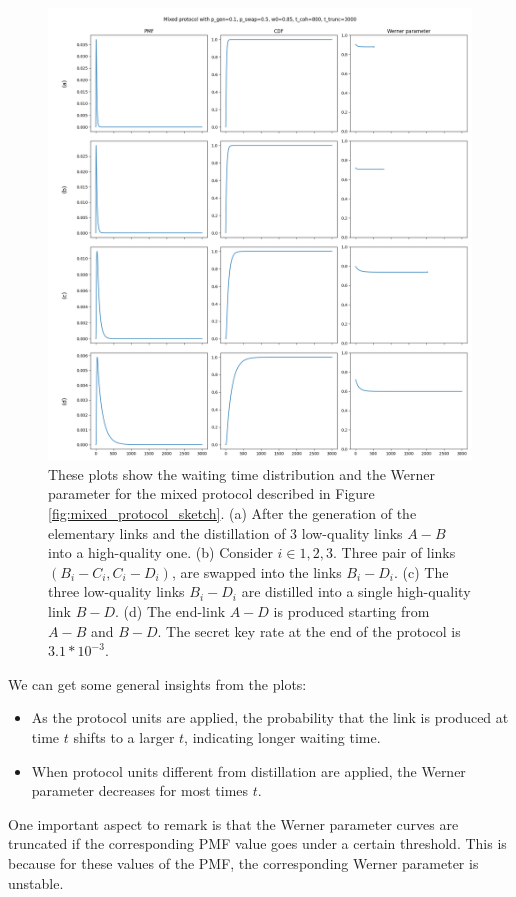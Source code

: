 \documentclass{masterthesis}
\begin{document}
\begin{figure}[ht]
    \centering
    \includegraphics[width=0.8\linewidth]{images/mixed_protocol_no_cutoffs.png}
    \caption{These plots show the waiting time distribution and the Werner parameter for the mixed protocol described in Figure \ref{fig:mixed_protocol_sketch}. (a) After the generation of the elementary links and the distillation of 3 low-quality links $A-B$ into a high-quality one. (b) Consider $i \in {1,2,3}$. Three pair of links $(B_i-C_i, C_i-D_i)$, are swapped into the links $B_i-D_i$. (c) The three low-quality links $B_i-D_i$ are distilled into a single high-quality link $B-D$. (d) The end-link $A-D$ is produced starting from $A-B$ and $B-D$. The secret key rate at the end of the protocol is $3.1 * 10^{-3}$.} %
    \label{fig:mixed_protocol} 
\end{figure}

We can get some general insights from the plots:
\begin{itemize}
    \item As the protocol units are applied, the probability that the link is produced at time $t$ shifts to a larger $t$, indicating longer waiting time.
    \item When protocol units different from distillation are applied, the Werner parameter decreases for most times $t$.
\end{itemize}

One important aspect to remark is that the Werner parameter curves are truncated if the corresponding PMF value goes under a certain threshold. This is because for these values of the PMF, the corresponding Werner parameter is unstable. %
\end{document}
